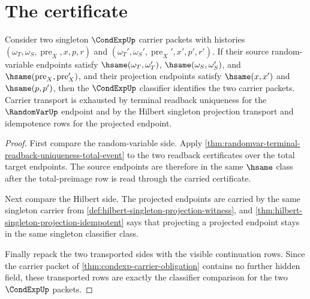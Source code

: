 \section{The certificate}
\label{sec:condexp-certificate}

\begin{theorem}
\label{thm:condexp-classifier-obligation}
Consider two singleton $\CondExpUp$ carrier packets with histories
$(\omega_T,\omega_S,\operatorname{pre}_X,x,p,r)$ and
$(\omega_T',\omega_S',\operatorname{pre}_X',x',p',r')$. If their source
random-variable endpoints satisfy
$\hsame(\omega_T,\omega_T')$, $\hsame(\omega_S,\omega_S')$, and
$\hsame(\operatorname{pre}_X,\operatorname{pre}_X')$, and their projection
endpoints satisfy $\hsame(x,x')$ and $\hsame(p,p')$, then the
$\CondExpUp$ classifier identifies the two carrier packets. Carrier
transport is exhausted by terminal readback uniqueness for the
$\RandomVarUp$ endpoint and by the Hilbert singleton projection transport and
idempotence rows for the projected endpoint.
\end{theorem}
\begin{proof}
First compare the random-variable side. Apply
\autoref{thm:randomvar-terminal-readback-uniqueness-total-event} to the two
readback certificates over the total target endpoints. The source endpoints
are therefore in the same $\hsame$ class after the total-preimage row is
read through the carried certificate.

Next compare the Hilbert side. The projected endpoints are carried by the
same singleton carrier from
\autoref{def:hilbert-singleton-projection-witness}, and
\autoref{thm:hilbert-singleton-projection-idempotent} says that projecting a
projected endpoint stays in the same singleton classifier class.

Finally repack the two transported sides with the visible continuation
rows. Since the carrier packet of
\autoref{thm:condexp-carrier-obligation} contains no further hidden field,
these transported rows are exactly the classifier comparison for the two
$\CondExpUp$ packets.
\end{proof}

